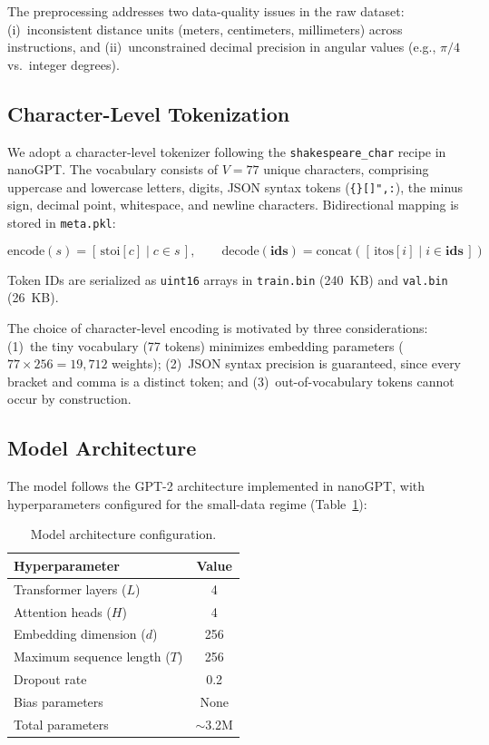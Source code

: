 \documentclass[11pt,a4paper]{article}
\begin{document}
The preprocessing addresses two data-quality issues in the raw dataset:
(i)~inconsistent distance units (meters, centimeters, millimeters) across instructions, and
(ii)~unconstrained decimal precision in angular values (e.g., $\pi/4$ vs.\ integer degrees).

\subsection{Character-Level Tokenization}

We adopt a character-level tokenizer following the \texttt{shakespeare\_char} recipe in nanoGPT.
The vocabulary consists of $V = 77$ unique characters, comprising uppercase and lowercase letters, digits,
JSON syntax tokens (\texttt{\{\}[]",:}), the minus sign, decimal point, whitespace, and newline characters.
Bidirectional mapping is stored in \texttt{meta.pkl}:

\begin{equation}
    \text{encode}(s) = [\,\text{stoi}[c] \mid c \in s\,], \qquad
    \text{decode}(\mathbf{ids}) = \text{concat}([\,\text{itos}[i] \mid i \in \mathbf{ids}\,])
\end{equation}

Token IDs are serialized as \texttt{uint16} arrays in \texttt{train.bin} (240~KB) and \texttt{val.bin} (26~KB).

The choice of character-level encoding is motivated by three considerations:
(1)~the tiny vocabulary (77 tokens) minimizes embedding parameters ($77 \times 256 = 19{,}712$ weights);
(2)~JSON syntax precision is guaranteed, since every bracket and comma is a distinct token; and
(3)~out-of-vocabulary tokens cannot occur by construction.

\subsection{Model Architecture}

The model follows the GPT-2 architecture implemented in nanoGPT,
with hyperparameters configured for the small-data regime (Table~\ref{tab:arch}):

\begin{table}[H]
    \centering
    \caption{Model architecture configuration.}
    \label{tab:arch}
    \begin{tabular}{@{}lc@{}}
        \toprule
        \textbf{Hyperparameter} & \textbf{Value} \\
        \midrule
        Transformer layers ($L$)     & 4 \\
        Attention heads ($H$)        & 4 \\
        Embedding dimension ($d$)    & 256 \\
        Maximum sequence length ($T$) & 256 \\
        Dropout rate                 & 0.2 \\
        Bias parameters              & None \\
        Total parameters             & $\sim$3.2M \\
        \bottomrule
    \end{tabular}
\end{table}
\end{document}
